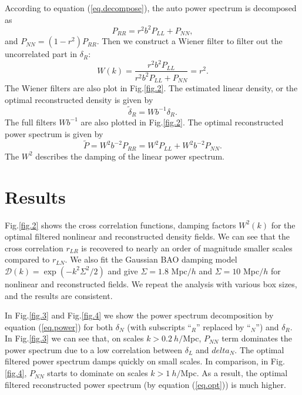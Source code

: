 \documentclass[aps,prd,twocolumn,superscriptaddress,amsfont,amssymb,amsmath,nofootinbib,showpacs,balancelastpage]{revtex4-1}
\begin{document}
According to equation (\ref{eq.decompose}), the auto power spectrum is decomposed as
\begin{equation}\label{eq.power}
    P_{RR}=r^2b^2P_{LL}+P_{NN},
\end{equation}
and $P_{NN}=(1-r^2)P_{RR}$. Then we construct a Wiener filter to filter out the uncorrelated part in $\delta_R$:
\begin{equation}
    W(k)=\frac{r^2b^2P_{LL}}{r^2b^2P_{LL}+P_{NN}}=r^2.
\end{equation}
The Wiener filters are also plot in Fig.\ref{fig.2}. The estimated linear density, or the optimal reconstructed density is given by
\begin{equation}
    \tilde\delta_R=Wb^{-1}\delta_R.
\end{equation}
The full filters $Wb^{-1}$ are also plotted in Fig.\ref{fig.2}.
The optimal reconstructed power spectrum is given by
\begin{equation}\label{eq.opt}
    \tilde P=W^2b^{-2}P_{RR}=W^2P_{LL}+W^2b^{-2}P_{NN}.
\end{equation}
The $W^2$ describes the damping of the linear power spectrum.

\section{Results}\label{sec.results}
Fig.\ref{fig.2} shows the cross correlation functions,
damping factors $W^2(k)$ for the optimal filtered 
nonlinear and reconstructed density fields.
We can see that the cross correlation $r_{LR}$ is recovered to
nearly an order of magnitude smaller scales compared to $r_{LN}$.
We also fit the Gaussian BAO damping model $
{\mathcal D}(k)=\exp(-k^2\Sigma^2/2)$ and give $\Sigma=1.8$ Mpc$/h$ and $\Sigma=10$ 
Mpc$/h$ for nonlinear and reconstructed fields.
We repeat the analysis with various box sizes,
and the results are consistent.

In Fig.\ref{fig.3} and Fig.\ref{fig.4} we show the power spectrum
decomposition by equation (\ref{eq.power}) for both $\delta_N$ 
(with subscripts ``$_R$'' replaced by ``$_N$'') and $\delta_R$.
In Fig.\ref{fig.3} we can see that, on scales $k>0.2\ h/$Mpc,
$P_{NN}$ term dominates the power spectrum due to a low correlation
between $\delta_L$ and $delta_N$. The optimal filtered power spectrum
damps quickly on small scales. In comparison, in Fig.\ref{fig.4},
$P_{NN}$ starts to dominate on scales $k>1\ h/$Mpc. As a result, the
optimal filtered reconstructed power spectrum
(by equation (\ref{eq.opt})) is much higher.
\end{document}
